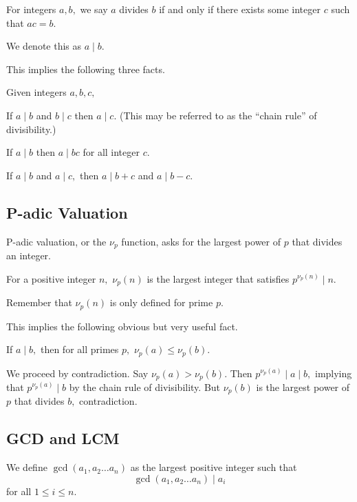 \documentclass[blue,onecol]{shooting}
\begin{document}
\begin{defi}[Divisibility]
For integers $a,b,$ we say $a$ divides $b$ if and only if there exists some integer $c$ such that $ac=b.$

We denote this as $a\mid b.$ %
\end{defi}
This implies the following three facts.

\begin{fact}
Given integers $a,b,c,$
\begin{itemize}
    \Item If $a\mid b$ and $b\mid c$ then $a\mid c.$ (This may be referred to as the “chain rule” of divisibility.)
    
    \Item If $a\mid b$ then $a\mid bc$ for all integer $c.$
    
    \Item If $a\mid b$ and $a\mid c,$ then $a\mid b+c$ and $a\mid b-c.$
\end{itemize}
\end{fact}

\subsection{P-adic Valuation}

P-adic valuation, or the $\nu_p$ function, asks for the largest power of $p$ that divides an integer.

\begin{defi}
For a positive integer $n,$ $\nu_p(n)$ is the largest integer that satisfies $p^{\nu_p(n)}\mid n.$
\end{defi}

Remember that $\nu_p(n)$ is only defined for prime $p.$

This implies the following obvious but very useful fact.

\begin{fact}
If $a\mid b,$ then for all primes $p,$ $\nu_p(a)\leq \nu_p(b).$
\end{fact}

\begin{pro}
We proceed by contradiction. Say $\nu_p(a)>\nu_p(b).$ Then $p^{\nu_p(a)}\mid a\mid b,$ implying that $p^{\nu_p(a)}\mid b$ by the chain rule of divisibility. But $\nu_p(b)$ is the largest power of $p$ that divides $b,$ contradiction.
\end{pro}

\subsection{GCD and LCM}
\begin{defi}We define $\gcd(a_1,a_2\dots a_n)$ as the largest positive integer such that \[\gcd(a_1,a_2\dots a_n)\mid a_i\] for all $1\leq i\leq n.$\end{defi}
\end{document}
